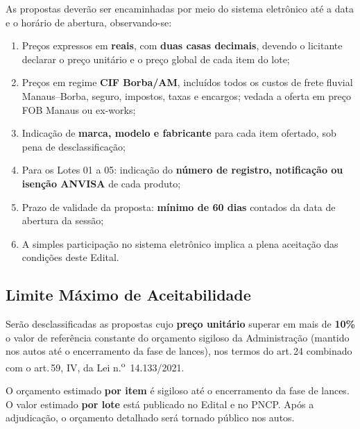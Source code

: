 \documentclass[12pt,a4paper]{article}
\newcommand{\art}[1]{art.\,#1}
\begin{document}
As propostas deverão ser encaminhadas por meio do sistema eletrônico até a data
e o horário de abertura, observando-se:

\begin{enumerate}
  \item Preços expressos em \textbf{reais}, com \textbf{duas casas decimais},
    devendo o licitante declarar o preço unitário e o preço global de cada item
    do lote;

  \item Preços em regime \textbf{CIF Borba/AM}, incluídos todos os custos de
    frete fluvial Manaus--Borba, seguro, impostos, taxas e encargos; vedada
    a oferta em preço FOB Manaus ou ex-works;

  \item Indicação de \textbf{marca, modelo e fabricante} para cada item ofertado,
    sob pena de desclassificação;

  \item Para os Lotes 01 a 05: indicação do \textbf{número de registro, notificação
    ou isenção ANVISA} de cada produto;

  \item Prazo de validade da proposta: \textbf{mínimo de 60 dias} contados da data
    de abertura da sessão;

  \item A simples participação no sistema eletrônico implica a plena aceitação das
    condições deste Edital.
\end{enumerate}

\subsection{Limite Máximo de Aceitabilidade}

Serão desclassificadas as propostas cujo \textbf{preço unitário} superar em mais
de \textbf{10\%} o valor de referência constante do orçamento sigiloso da
Administração (mantido nos autos até o encerramento da fase de lances), nos termos
do \art{24} combinado com o \art{59}, IV, da Lei n.\textsuperscript{o}~14.133/2021.

\begin{alertbox}
\small
O orçamento estimado \textbf{por item} é sigiloso até o encerramento da fase de
lances. O valor estimado \textbf{por lote} está publicado no Edital e no PNCP.
Após a adjudicação, o orçamento detalhado será tornado público nos autos.
\end{alertbox}
\end{document}
